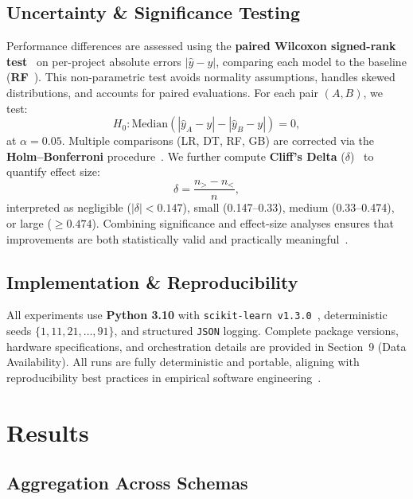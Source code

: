 \documentclass{ieeeaccess}
\begin{document}
\subsection{Uncertainty \& Significance Testing}
\label{sec:statistical-tests}
Performance differences are assessed using the 
\textbf{paired Wilcoxon signed-rank test}~\cite{wilcoxon1945individual} 
on per-project absolute errors $|\hat{y}-y|$, 
comparing each model to the baseline (\textbf{RF}~\cite{breiman2001random}).  
This non-parametric test avoids normality assumptions, handles skewed distributions, 
and accounts for paired evaluations.  
For each pair $(A,B)$, we test:
\[
H_0:\mathrm{Median}(|\hat{y}_A{-}y|-|\hat{y}_B{-}y|)=0,
\]
at $\alpha=0.05$.  
Multiple comparisons (LR, DT, RF, GB) are corrected via 
the \textbf{Holm--Bonferroni} procedure~\cite{holm1979simple}.  
We further compute \textbf{Cliff's Delta} ($\delta$)~\cite{macbeth2011cliffs} 
to quantify effect size:
\[
\delta=\frac{n_{>}-n_{<}}{n},
\]
interpreted as negligible ($|\delta|<0.147$), small (0.147--0.33), 
medium (0.33--0.474), or large ($\ge0.474$).  
Combining significance and effect-size analyses ensures 
that improvements are both statistically valid and practically meaningful~\cite{demvsar2006statistical,garcia2010advanced}.



\subsection{Implementation \& Reproducibility}
All experiments use \textbf{Python 3.10} with \texttt{scikit-learn v1.3.0}~\cite{pedregosa2011scikit}, deterministic seeds $\{1,11,21,\dots,91\}$, and structured \texttt{JSON} logging.  
Complete package versions, hardware specifications, and orchestration details are provided in Section~9 (Data Availability).
All runs are fully deterministic and portable, 
aligning with reproducibility best practices in 
empirical software engineering~\cite{cruz2019open,lopez2021empirical}.





\section{Results}

\subsection{Aggregation Across Schemas}
\label{sec:aggregation}
\end{document}
